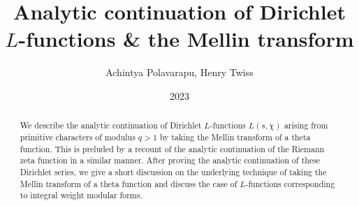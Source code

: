 \documentclass[12pt,reqno]{amsart}
\theoremstyle{definition}
\numberwithin{equation}{section}
\begin{document}
\begin{abstract}
    We describe the analytic continuation of Dirichlet $L$-functions $L(s,\chi)$ arising from primitive characters of modulus $q > 1$ by taking the Mellin transform of a theta function. This is preluded by a recount of the analytic continuation of the Riemann zeta function in a similar manner. After proving the analytic continuation of these Dirichlet series, we give a short discussion on the underlying technique of taking the Mellin transform of a theta function and discuss the case of $L$-functions corresponding to integral weight modular forms.
\end{abstract}

\title{Analytic continuation of Dirichlet $L$-functions \& the Mellin transform}
\author{Achintya Polavarapu, Henry Twiss}
\date{2023}
\maketitle
\thispagestyle{empty}
\end{document}
